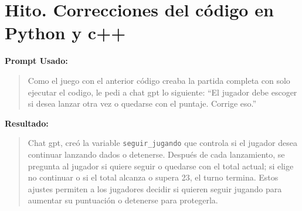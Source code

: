 \documentclass{article}
\begin{document}
\section{Hito. Correcciones del código en Python y c++}


\textbf{Prompt Usado:}

\begin{quote}
Como el juego con el anterior código creaba la partida completa con solo ejecutar el codigo, le pedi a chat gpt lo siguiente: “El jugador debe escoger si desea lanzar otra vez o quedarse con el puntaje. Corrige eso.”
\end{quote}

\textbf{Resultado:}
\begin{quote}
Chat gpt, creó la variable \verb|seguir_jugando| que controla si el jugador desea continuar lanzando dados o detenerse. Después de cada lanzamiento, se pregunta al jugador si quiere seguir o quedarse con el total actual; si elige no continuar o si el total alcanza o supera 23, el turno termina. Estos ajustes permiten a los jugadores decidir si quieren seguir jugando para aumentar su puntuación o detenerse para protegerla.
\end{quote}
\end{document}
